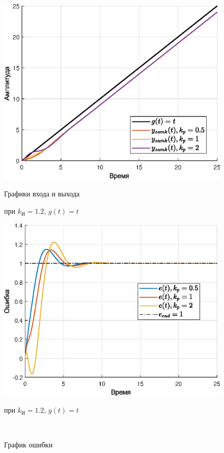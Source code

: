 \documentclass[a4paper]{article}
\begin{document}
\begin{figure}[H]
    \begin{minipage}{0.5\textwidth}
        \centering \includegraphics[width=\textwidth]{ex5/ki_1.2_g_vt.eps}
        \caption{Графики входа и выхода}
        \centerline{при $k_{\text{И}} = 1.2$, $g(t)=t$}
    \end{minipage}\hfill
    \begin{minipage}{0.5\textwidth}
        \centering \includegraphics[width=\textwidth]{ex5/ki_1.2_g_vt_error.eps}
        \caption{График ошибки}
        \centerline{при $k_{\text{И}} = 1.2$, $g(t)=t$}
    \end{minipage}\\[1em]
\end{figure}\noindent\
\end{document}
